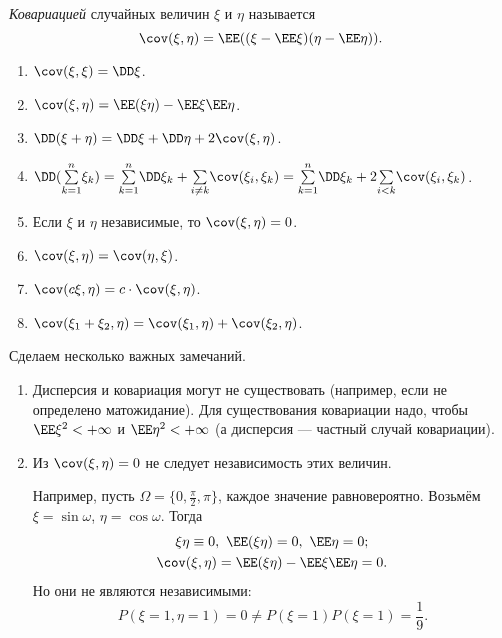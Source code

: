  \begin{definition}
    \textit{Ковариацией} случайных величин $\xi$ и $\eta$ называется
     $$\cov(\xi, \eta) = \EE ((\xi - \EE \xi)(\eta - \EE \eta)).$$
 \end{definition}

 \begin{properties}[ковариации]
\enewline
     \begin{enumerate}

         \item $\cov(\xi, \xi) = \DD \xi$.


         \item $\cov(\xi, \eta) = \EE (\xi\eta) - \EE \xi \EE \eta$.


         \item $\DD (\xi + \eta) = \DD \xi + \DD \eta + 2\cov(\xi, \eta)$.

         \item $\DD (\overset{n}{\underset{k = 1}{\sum}}\xi_k) = \overset{n}{\underset{k = 1}{\sum}}\DD \xi_k + \underset{i\neq k}{\sum}\cov(\xi_i, \xi_k) =
                   \overset{n}{\underset{k = 1}{\sum}}\DD \xi_k + 2\underset{i < k}{\sum}\cov(\xi_i, \xi_k)$.

         \item Если $\xi$ и $\eta$ независимые, то $\cov(\xi, \eta) = 0$.

         \item $\cov(\xi, \eta) = \cov(\eta, \xi)$.


         \item $\cov(c\xi, \eta) = c\cdot \cov(\xi, \eta)$.


         \item $\cov(\xi_1+\xi_2, \eta) = \cov(\xi_1, \eta) + \cov(\xi_2, \eta)$.
     \end{enumerate}
 \end{properties}

Сделаем несколько важных замечаний.

     \begin{enumerate}
         \item Дисперсия и ковариация могут не существовать (например, если не определено матожидание). Для существования ковариации надо, чтобы $\EE \xi^2 < +\infty$ и $\EE \eta^2 < +\infty$ (а дисперсия --- частный случай ковариации).

         \item Из $\cov(\xi, \eta) = 0$ не следует независимость этих величин.

               Например, пусть $\Omega = \{0, \frac{\pi}{2}, \pi\}$, каждое значение равновероятно. Возьмём
               $\xi = \sin\omega$, $\eta = \cos\omega$. Тогда 
               \begin{gather*}
                   \xi\eta\equiv 0, \ \EE (\xi\eta) = 0, \ \EE \eta = 0;\\
                   \cov(\xi, \eta) = \EE (\xi\eta) - \EE \xi \EE \eta = 0.
               \end{gather*}
               Но они не являются независимыми:
               $$P(\xi = 1, \eta = 1) = 0 \neq P(\xi = 1)P(\xi = 1) = \frac{1}{9}.$$
     \end{enumerate}

